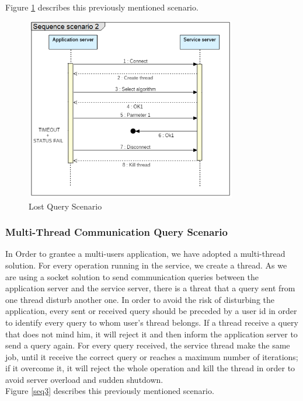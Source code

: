Figure \ref{seq2} describes this previously mentioned scenario.

\begin{figure}[!ht]
\begin{center}
\includegraphics[width=9.3cm,height=8cm]{chapter4/SequenceDiagram2.png}
\end{center}
\caption{Lost Query Scenario}
\label{seq2}
\end{figure}




\subsubsection{Multi-Thread Communication Query Scenario}
In Order to grantee a multi-users application, we have adopted a multi-thread solution.  For every operation running in the service, we create a thread. As we are using a socket solution to send communication queries between the application server and the service server, there is a threat that a query sent from one thread disturb another one. In order to avoid the risk of disturbing the application, every sent or received query should be preceded by a user id in order to identify every query to whom user's thread belongs. If a thread receive a query that does not mind him, it will reject it and then inform the application server to send a query again. For every query received, the service thread make the same job, until it receive the correct query or reaches a maximum number of iterations; if it overcome it, it will reject the whole operation and kill the thread in order to avoid server overload and sudden shutdown.\\

Figure \ref{seq3} describes this previously mentioned scenario.  

